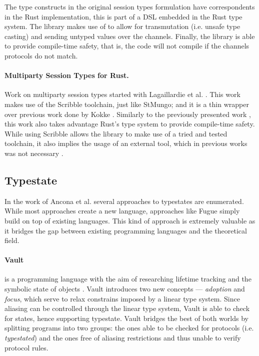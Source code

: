 The type constructs in the original session types formulation have correspondents in the Rust implementation,
this is part of a DSL embedded in the Rust type system.
The library makes use of  to allow for transmutation (i.e. unsafe type casting)
and sending untyped values over the channels.
Finally, the library is able to provide compile-time safety, that is, the code will not compile if the channels protocols do not match.

\paragraph{Multiparty Session Types for Rust.}
Work on multiparty session types started with Lagaillardie et al. \autocite{Lagaillardie2020}.
This work makes use of the Scribble \autocite{Yoshida2014} toolchain, just like StMungo;
and it is a thin wrapper over previous work done by Kokke \autocite{Kokke2019}.
Similarly to the previously presented work \autocite{Jespersen2015},
this work also takes advantage Rust's type system to provide compile-time safety.
While using Scribble allows the library to make use of a tried and tested toolchain,
it also implies the usage of an external tool, which in previous works was not necessary \autocite{Jespersen2015, Kokke2019}.

\subsection{Typestate}
In the work of Ancona et al. \autocite[Section 2.3]{Ancona2016} several approaches to typestates are enumerated.
While most approaches create a new language,
approaches like Fugue \autocite{DeLine2004} simply build on top of existing languages.
This kind of approach is extremely valuable as it bridges the gap between existing programming languages and the theoretical field.

\paragraph{Vault} is a programming language with the aim of researching lifetime tracking and the symbolic state of objects \autocite{Fahndrich2002}.
Vault introduces two new concepts — \emph{adoption} and \emph{focus}, which serve to relax constrains imposed by a linear type system.
Since aliasing can be controlled through the linear type system, Vault is able to check for states, hence supporting typestate.
Vault bridges the best of both worlds by splitting programs into two groups:
the ones able to be checked for protocols (i.e. \emph{typestated}) and
the ones free of aliasing restrictions and thus unable to verify protocol rules.


